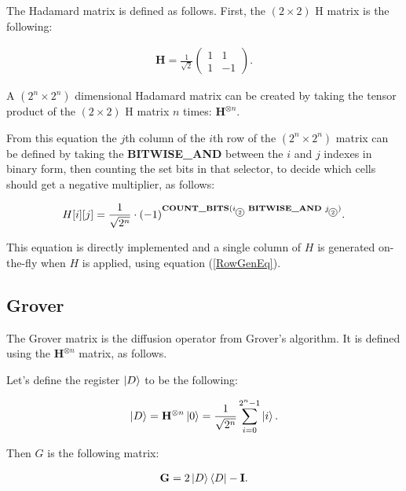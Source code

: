 The Hadamard matrix is defined as follows. First, the $(2\times{}2)$ H matrix is the following:

\begin{align*}
  \mathbf{H} = \frac{1}{\sqrt{2}}\begin{pmatrix}
      1 & 1  \\
      1 & -1
    \end{pmatrix}.
\end{align*}

A $(2^n\times{}2^n)$ dimensional Hadamard matrix can be created by taking the tensor product of the $(2\times{}2)$ H matrix $n$ times: $\mathbf{H}^{\otimes{}n}$.

From this equation the $j$th column of the $i$th row of the $(2^n\times{}2^n)$ matrix can be defined by taking the \textbf{BITWISE\_AND} between the $i$ and $j$ indexes in binary form, then counting the set bits in that selector, to decide which cells should get a negative multiplier, as follows:

\newcommand*\circled[1]{\tikz[baseline=(char.base)]{
            \node[shape=circle,draw,inner sep=1pt] (char) {#1};}}

\begin{align*}
H[i][j] = \frac{1}{\sqrt{2^n}}\cdot{}(-1)^{\text{\textbf{COUNT\_BITS}}(i_{\text{\circled{2}}} \text{\textbf{ BITWISE\_AND }} j_{\text{\circled{2}}})}.
\end{align*}

This equation is directly implemented and a single column of $H$ is generated on-the-fly when $H$ is applied, using equation (\ref{RowGenEq}).

\subsection{Grover}

The Grover matrix is the diffusion operator from Grover's algorithm. It is defined using the $\mathbf{H}^{\otimes{}n}$ matrix, as follows.

Let's define the register $\ket{D}$ to be the following:

\begin{align*}
\ket{D} = \mathbf{H}^{\otimes{}n}\ket{0} =
\frac{1}{\sqrt{2^n}} \sum\limits_{i=0}^{2^n-1} \ket{i}.
\end{align*}

Then $G$ is the following matrix:

\begin{align*}
    \mathbf{G} = 2\ket{D}\bra{D} - \mathbf{I}.
\end{align*}

